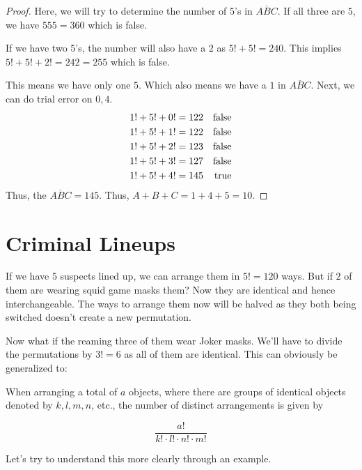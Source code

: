 \begin{proof}
    Here, we will try to determine the number of \(5\)'s in \(\overline{ABC}\). 
    If all three are \(5\), we have \(555=360\) which is false.

    If we have two \(5\)'s, the number will also have a \(2\) as \(5!+5!=240\). 
    This implies \(5!+5!+2!=242=255\) which is false.

    This means we have only one \(5\). Which also means we have a \(1\) in \(\overline{ABC}\). 
    Next, we can do trial error on \(0,4\).
    \begin{align*}
        1!+5!+0! & = 122 & \operatorname{false} \\
        1!+5!+1! & = 122 & \operatorname{false} \\
        1!+5!+2! & = 123 & \operatorname{false} \\
        1!+5!+3! & = 127 & \operatorname{false} \\
        1!+5!+4! & = 145 & \operatorname{true} \\
    \end{align*}
    Thus, the \(\overline{ABC}=145\). Thus, \(A+B+C=1+4+5=10\).
\end{proof}
\section{Criminal Lineups}

If we have \(5\) suspects lined up, we can arrange them in \(5!=120\) ways. 
But if \(2\) of them are wearing squid game masks them? 
Now they are identical and hence interchangeable. The ways to arrange them now will be halved 
as they both being switched doesn't create a new permutation.

Now what if the reaming three of them wear Joker masks. We'll have to divide the permutations by $3!=6$ as all 
of them are identical. This can obviously be generalized to:

\begin{theorem}
When arranging a total of \(a\) objects, where there are groups of identical objects denoted by 
\(k, l, m, n\), etc., the number of distinct arrangements is given by 

\[\frac{a!}{k! \cdot l! \cdot n! \cdot m!}\]

\end{theorem}

Let's try to understand this more clearly through an example.


